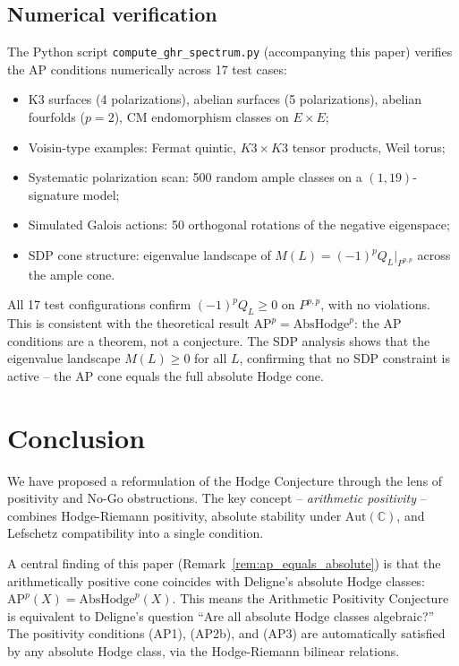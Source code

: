 \documentclass[aps,prd,twocolumn,superscriptaddress,nofootinbib]{revtex4-2}
\theoremstyle{definition}
\theoremstyle{remark}
\begin{document}
\subsection{Numerical verification}

The Python script \texttt{compute\_ghr\_spectrum.py} (accompanying this paper) verifies the AP conditions numerically across 17 test cases:
\begin{itemize}
\item K3 surfaces (4 polarizations), abelian surfaces (5 polarizations), abelian fourfolds ($p = 2$), CM endomorphism classes on $E \times E$;
\item Voisin-type examples: Fermat quintic, $K3 \times K3$ tensor products, Weil torus;
\item Systematic polarization scan: 500 random ample classes on a $(1, 19)$-signature model;
\item Simulated Galois actions: 50 orthogonal rotations of the negative eigenspace;
\item SDP cone structure: eigenvalue landscape of $M(L) = (-1)^p Q_L|_{P^{p,p}}$ across the ample cone.
\end{itemize}

All 17 test configurations confirm $(-1)^p Q_L \geq 0$ on $P^{p,p}$, with no violations. This is consistent with the theoretical result $\mathrm{AP}^p = \mathrm{AbsHodge}^p$: the AP conditions are a theorem, not a conjecture. The SDP analysis shows that the eigenvalue landscape $M(L) \geq 0$ for all $L$, confirming that no SDP constraint is active -- the AP cone equals the full absolute Hodge cone.

\section{Conclusion}
\label{sec:conclusion}

We have proposed a reformulation of the Hodge Conjecture through the lens of positivity and No-Go obstructions. The key concept -- \textit{arithmetic positivity} -- combines Hodge-Riemann positivity, absolute stability under $\mathrm{Aut}(\mathbb{C})$, and Lefschetz compatibility into a single condition.

A central finding of this paper (Remark~\ref{rem:ap_equals_absolute}) is that the arithmetically positive cone coincides with Deligne's absolute Hodge classes: $\mathrm{AP}^p(X) = \mathrm{AbsHodge}^p(X)$. This means the Arithmetic Positivity Conjecture is equivalent to Deligne's question ``Are all absolute Hodge classes algebraic?'' The positivity conditions (AP1), (AP2b), and (AP3) are automatically satisfied by any absolute Hodge class, via the Hodge-Riemann bilinear relations.
\end{document}
